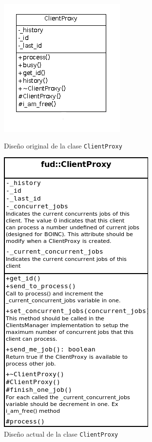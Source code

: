 \begin{figure}[H]
	\hfill
	\begin{minipage}[t]{.4\textwidth}
		\begin{center}
	  		\includegraphics[scale=0.65]{images/ClientProxy-orig.png}
			\caption{Diseño original de la clase \texttt{ClientProxy}}
			\label{fig:ClientProxy:orig}
		\end{center}
	\end{minipage}
	\hfill
	\begin{minipage}[t]{.4\textwidth}
		\begin{center}
	  		\includegraphics[scale=0.55]{redesing-multiplesJobs-on-client/ClientProxy.png}
			\caption{Diseño actual de la clase \texttt{ClientProxy}}
			\label{fig:ClientProxy:actual}
		\end{center}
	\end{minipage}
\end{figure}

